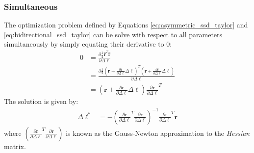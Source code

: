 \subsubsection*{Simultaneous}
\label{sec:gauss_newton_simultaneous}

The optimization problem defined by Equations \ref{eq:asymmetric_ssd_taylor}  and \ref{eq:bidirectional_ssd_taylor} can be solve with respect to all parameters simultaneously by simply equating their derivative to $0$:
\begin{equation}
    \begin{aligned}
		0 & = \frac{\partial\frac{1}{2}\hat{\mathbf{r}}^T \hat{\mathbf{r}}}{\partial \Delta \boldsymbol{\ell}}
		\\
		& = \frac{\partial\frac{1}{2}(\mathbf{r} + \frac{\partial \mathbf{r}}{\partial \Delta \boldsymbol{\ell}} \Delta \boldsymbol{\ell})^T(\mathbf{r} + \frac{\partial \mathbf{r}}{\partial \Delta \boldsymbol{\ell}} \Delta \boldsymbol{\ell})}{\partial \Delta \boldsymbol{\ell}}
		\\
		& = \left( \mathbf{r} + \frac{\partial \mathbf{r}}{\partial \Delta \boldsymbol{\ell}} \Delta \boldsymbol{\ell} \right) \frac{\partial \mathbf{r}}{\partial \Delta \boldsymbol{\ell}}^T
    \label{eq:ssd_bc}
    \end{aligned}
\end{equation}
The solution is given by:
\begin{equation}
    \begin{aligned}
		\Delta \boldsymbol{\ell}^* & =  -\left( \frac{\partial \mathbf{r}}{\partial \Delta \boldsymbol{\ell}}^T \frac{\partial \mathbf{r}}{\partial \Delta \boldsymbol{\ell}} \right)^{-1} \frac{\partial \mathbf{r}}{\partial \Delta \boldsymbol{\ell}}^T \mathbf{r}
    \label{eq:sim_solution}
    \end{aligned}
\end{equation}
where $\left( \frac{\partial \mathbf{r}}{\partial \Delta \boldsymbol{\ell}}^T \frac{\partial \mathbf{r}}{\partial \Delta \boldsymbol{\ell}} \right)$ is known as the Gauss-Newton approximation to the \emph{Hessian} matrix.

